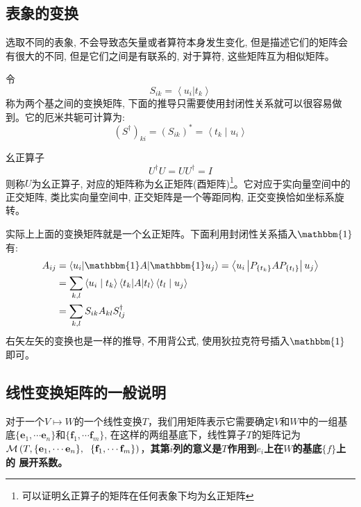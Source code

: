 \subsection*{表象的变换}
选取不同的表象, 不会导致态矢量或者算符本身发生变化, 但是描述它们的矩阵会有很大的不同, 但是它们之间是有联系的, 对于算符, 这些矩阵互为相似矩阵。

令$$S_{ik}=\left\langle u_i  | t_k  \right\rangle$$称为两个基之间的变换矩阵, 下面的推导只需要使用封闭性关系就可以很容易做到。它的厄米共轭可计算为:
$$
\left(S^{\dagger}\right)_{k i}=\left(S_{i k}\right)^{*}=\left\langle t_{k} \mid u_{i}\right\rangle
$$
\begin{define}{幺正算子}
    \begin{equation}
        \boxed{U^\dagger U=U U^\dagger=I}
    \end{equation}
    则称$U$为幺正算子, 对应的矩阵称为幺正矩阵(酉矩阵)\footnote[1]{可以证明幺正算子的矩阵在任何表象下均为幺正矩阵}。它对应于实向量空间中的正交矩阵, 类比实向量空间中, 正交矩阵是一个等距同构, 正交变换恰如坐标系旋转。
\end{define}
实际上上面的变换矩阵就是一个幺正矩阵。下面利用封闭性关系插入$\mathbbm{1}$有:
\begin{equation*}
   \begin{aligned}
    A_{i j} &=\left\langle u_{i}|\mathbbm{1}A|\mathbbm{1}u_{j}\right\rangle=\left\langle u_{i}\left|P_{\left\{t_{k}\right\}} A P_{\left\{t_{l}\right\}}\right| u_{j}\right\rangle \\
    &=\sum_{k, l}\left\langle u_{i} \mid t_{k}\right\rangle\left\langle t_{k}|A| t_{l}\right\rangle\left\langle t_{l} \mid u_{j}\right\rangle \\
    &=\sum_{k, l} S_{i k} A_{k l} S_{l j}^{\dagger}
    \end{aligned} 
\end{equation*}
右矢左矢的变换也是一样的推导, 不用背公式, 使用狄拉克符号插入$\mathbbm{1}$即可。
\subsection*{线性变换矩阵的一般说明}
对于一个$V\mapsto W$的一个线性变换$T$，我们用矩阵表示它需要确定$V$和$W$中的一组基底$\{\mathbf{e}_1,\cdots\mathbf{e}_n\}$和$\{\mathbf{f}_1,\cdots\mathbf{f}_m\}$,
在这样的两组基底下，线性算子$T$的矩阵记为$\mathcal{M}\left(T,\{\mathbf{e}_1,\cdots\mathbf{e}_n\},\right.\\\left.\{\mathbf{f}_1,\cdots\mathbf{f}_m\}\right)$，\textbf{其第$i$列的意义是$T$作用到$e_i$上在$W$的基底$\{f\}$上的
展开系数。}

